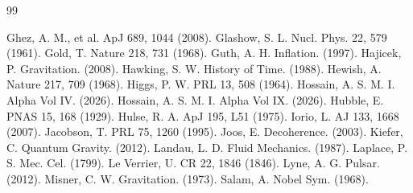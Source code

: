 \documentclass[12pt,a4paper]{article}
\begin{document}
\begin{thebibliography}{99}
\begin{singlespace}
 Ghez, A. M., et al. ApJ 689, 1044 (2008).
 Glashow, S. L. Nucl. Phys. 22, 579 (1961).
 Gold, T. Nature 218, 731 (1968).
 Guth, A. H. Inflation. (1997).
 Hajicek, P. Gravitation. (2008).
 Hawking, S. W. History of Time. (1988).
 Hewish, A. Nature 217, 709 (1968).
 Higgs, P. W. PRL 13, 508 (1964).
 Hossain, A. S. M. I. Alpha Vol IV. (2026).
 Hossain, A. S. M. I. Alpha Vol IX. (2026).
 Hubble, E. PNAS 15, 168 (1929).
 Hulse, R. A. ApJ 195, L51 (1975).
 Iorio, L. AJ 133, 1668 (2007).
 Jacobson, T. PRL 75, 1260 (1995).
 Joos, E. Decoherence. (2003).
 Kiefer, C. Quantum Gravity. (2012).
 Landau, L. D. Fluid Mechanics. (1987).
 Laplace, P. S. Mec. Cel. (1799).
 Le Verrier, U. CR 22, 1846 (1846).
 Lyne, A. G. Pulsar. (2012).
 Misner, C. W. Gravitation. (1973).
 Salam, A. Nobel Sym. (1968).
\end{singlespace}
\end{thebibliography}

\newpage
\end{document}
